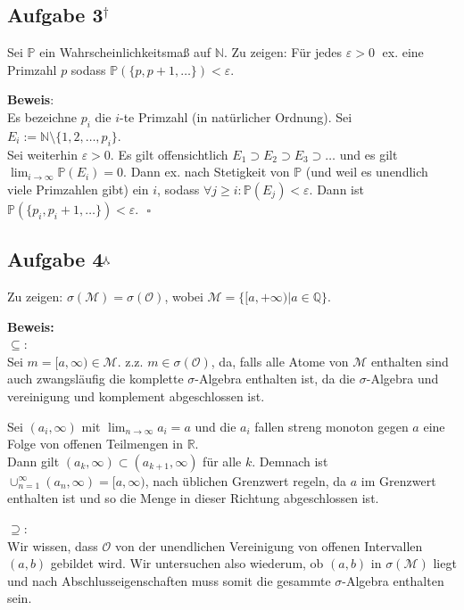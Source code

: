\documentclass[11pt,a4paper,ngerman]{article}
\newcommand{\set}[1]{ \{ #1 \}}
\newcommand{\Prob}{\mathbb{P}}
\begin{document}
\subsection*{Aufgabe 3$^\dagger$}
Sei $\Prob$ ein Wahrscheinlichkeitsmaß auf $\mathbb{N}$. Zu zeigen: Für jedes $\varepsilon > 0 \; $ ex. eine Primzahl $p$ sodass $\Prob(\set{p,p+1,\ldots}) < \varepsilon$.

\textbf{Beweis}: \\
Es bezeichne $p_i$ die $i$-te Primzahl (in natürlicher Ordnung). Sei $E_i := \mathbb{N} \setminus \set{1,2,\ldots,p_i}$. \\
Sei weiterhin $\varepsilon > 0$. Es gilt offensichtlich $E_1 \supset E_2 \supset E_3 \supset \ldots$ und es gilt
$\lim_{i \to \infty} \Prob(E_i) = 0$. Dann ex. nach Stetigkeit von $\Prob$ (und weil es unendlich viele Primzahlen gibt) ein $i$, sodass $\forall j \geq i: \Prob(E_j) < \varepsilon$.
Dann ist $\Prob(\set{p_i,p_i+1,\ldots}) <\varepsilon$. $\mbox{}$ \hfill $\square$



\subsection*{Aufgabe 4$^\curlywedgedownarrow$}
Zu zeigen: $\sigma(\mathcal{M}) = \sigma(\mathcal{O})$, wobei $\mathcal{M} = \set{[a, +\infty) | a \in \mathbb{Q}}$.

\textbf{Beweis:}\\

$\subseteq$:\\

Sei $m = [ a, \infty) \in \mathcal{M}$. z.z. $m \in \sigma (\mathcal{O})$,
da, falls alle Atome von $\mathcal{M}$ enthalten sind auch zwangsläufig die
komplette $\sigma$-Algebra enthalten ist, da die $\sigma$-Algebra und vereinigung und komplement abgeschlossen ist.


Sei $(a_i, \infty)$ mit $\lim_{n\rightarrow \infty} a_i = a$ und die $a_i$ fallen streng monoton gegen $a$ eine
Folge von offenen Teilmengen in $\mathbb{R}$.\\
Dann gilt $(a_k, \infty) \subset (a_{k+1}, \infty)$ für alle $k$.
Demnach ist $\cup_{n=1}^\infty (a_n, \infty) = [a, \infty)$, nach üblichen
Grenzwert regeln, da $a$ im Grenzwert enthalten ist und so die Menge in dieser
Richtung abgeschlossen ist.

$\supseteq$:\\

Wir wissen, dass $\mathcal{O}$ von der unendlichen Vereinigung von 
offenen Intervallen $(a,b)$ gebildet wird. Wir untersuchen also wiederum, ob
$(a,b)$ in $\sigma(\mathcal{M})$ liegt und nach Abschlusseigenschaften muss
somit die gesammte $\sigma$-Algebra enthalten sein.\\
\end{document}
